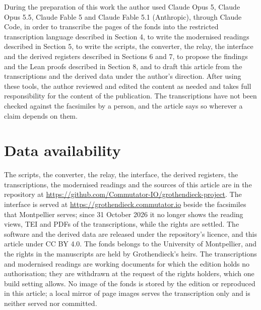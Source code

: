 \documentclass[11pt]{article}
\begin{document}
During the preparation of this work the author used Claude Opus 5, Claude Opus 5.5, Claude Fable 5 and Claude Fable 5.1 (Anthropic), through Claude Code, in order to transcribe the pages of the fonds into the restricted transcription language described in Section 4, to write the modernised readings described in Section 5, to write the scripts, the converter, the relay, the interface and the derived registers described in Sections 6 and 7, to propose the findings and the Lean proofs described in Section 8, and to draft this article from the transcriptions and the derived data under the author's direction. After using these tools, the author reviewed and edited the content as needed and takes full responsibility for the content of the publication. The transcriptions have not been checked against the facsimiles by a person, and the article says so wherever a claim depends on them.

\section*{Data availability}

The scripts, the converter, the relay, the interface, the derived registers, the transcriptions, the modernised readings and the sources of this article are in the repository at \url{https://github.com/Commutator-IO/grothendieck-project}. The interface is served at \url{https://grothendieck.commutator.io} beside the facsimiles that Montpellier serves; since 31 October 2026 it no longer shows the reading views, TEI and PDFs of the transcriptions, while the rights are settled. The software and the derived data are released under the repository's licence, and this article under CC BY 4.0. The fonds belongs to the University of Montpellier, and the rights in the manuscripts are held by Grothendieck's heirs. The transcriptions and modernised readings are working documents for which the edition holds no authorisation; they are withdrawn at the request of the rights holders, which one build setting allows. No image of the fonds is stored by the edition or reproduced in this article; a local mirror of page images serves the transcription only and is neither served nor committed.
\end{document}
